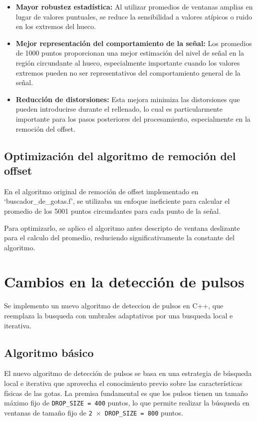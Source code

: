 \documentclass[12pt,a4paper]{article}
\begin{document}
\begin{itemize}
    \item \textbf{Mayor robustez estadística:} Al utilizar promedios de ventanas amplias en lugar de valores puntuales, se reduce la sensibilidad a valores atípicos o ruido en los extremos del hueco.
    
    \item \textbf{Mejor representación del comportamiento de la señal:} Los promedios de 1000 puntos proporcionan una mejor estimación del nivel de señal en la región circundante al hueco, especialmente importante cuando los valores extremos pueden no ser representativos del comportamiento general de la señal.
    
    \item \textbf{Reducción de distorsiones:} Esta mejora minimiza las distorsiones que pueden introducirse durante el rellenado, lo cual es particularmente importante para los pasos posteriores del procesamiento, especialmente en la remoción del offset.
\end{itemize}

\subsection{Optimización del algoritmo de remoción del offset}

En el algoritmo original de remoción de offset implementado en `buscador\_de\_gotas.f', se utilizaba un enfoque ineficiente para calcular el promedio de los 5001 puntos circundantes para cada punto de la señal.

Para optimizarlo, se aplico el algoritmo antes descripto de ventana deslizante para el calculo del promedio, reduciendo significativamente la constante del algoritmo.

\section{Cambios en la detección de pulsos}
\lhead{}

Se implemento un nuevo algoritmo de deteccion de pulsos en C++, que reemplaza la busqueda con umbrales adaptativos por una busqueda local e iterativa.

\subsection{Algoritmo básico}

El nuevo algoritmo de detección de pulsos se basa en una estrategia de búsqueda local e iterativa que aprovecha el conocimiento previo sobre las características físicas de las gotas. La premisa fundamental es que los pulsos tienen un tamaño máximo fijo de \texttt{DROP\_SIZE = 400} puntos, lo que permite realizar la búsqueda en ventanas de tamaño fijo de \texttt{2 $\times$ DROP\_SIZE = 800} puntos.
\end{document}
